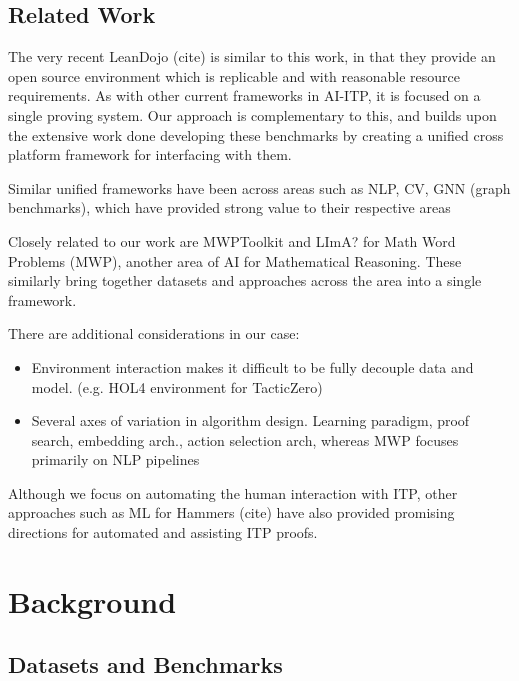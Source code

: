 \documentclass[letterpaper]{article} %
\begin{document}
    \subsection{Related Work}
    The very recent LeanDojo (cite) is similar to this work, in that they provide an open source environment
    which is replicable and with reasonable resource requirements.
    As with other current frameworks in AI-ITP, it is focused on a single proving system.
    Our approach is complementary to this, and builds upon the extensive work done developing these benchmarks
    by creating a unified cross platform framework for interfacing with them.


    Similar unified frameworks have been across areas such as NLP, CV, GNN (graph benchmarks),
    which have provided strong value to their respective areas

    Closely related to our work are MWPToolkit and LImA? for Math Word Problems (MWP),
    another area of AI for Mathematical Reasoning.
    These similarly bring together datasets and approaches across the area into a single framework.

    There are additional considerations in our case:

    \begin{itemize}
        \item Environment interaction makes it difficult to be fully decouple data and model. (e.g. HOL4 environment for TacticZero)
        \item Several axes of variation in algorithm design. Learning paradigm, proof search, embedding arch., action selection
        arch, whereas MWP focuses primarily on NLP pipelines
    \end{itemize}


    Although we focus on automating the human interaction with ITP, other approaches such as ML for Hammers (cite) have also
    provided promising directions for automated and assisting ITP proofs.


    \section{Background}

    \subsection{Datasets and Benchmarks}

\end{document}

